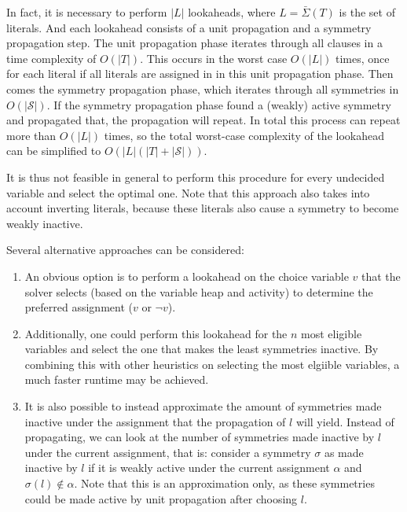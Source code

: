 In fact, it is necessary to perform $|L|$ lookaheads, where $L = \bar{\Sigma}(T)$ is the set of literals.
	And each lookahead consists of a unit propagation and a symmetry propagation step.
	The unit propagation phase iterates through all clauses in a time complexity of $O(|T|)$.
	This occurs in the worst case $O(|L|)$ times,
	once for each literal if all literals are assigned in in this unit propagation phase.
	Then comes the symmetry propagation phase, which iterates through all symmetries in $O(|\mathcal{S}|)$.
	If the symmetry propagation phase found a (weakly) active symmetry and propagated that,
	the propagation will repeat.
	In total this process can repeat more than $O(|L|)$ times,
	so the total worst-case complexity of the lookahead can be simplified to $O(|L|(|T| + |\mathcal{S}|))$.
	

	It is thus not feasible in general to perform this procedure for every undecided variable and
	select the optimal one.
	Note that this approach also takes into account inverting literals,
	because these literals also cause a symmetry to become weakly inactive.
	
	Several alternative approaches can be considered:

	\begin{enumerate}
		\item An obvious option is to perform a lookahead on the choice variable $v$ that the solver
			selects (based on the variable heap and activity) to determine the
			preferred assignment ($v$ or $\neg v$).

		\item Additionally, one could perform this lookahead for the $n$ most eligible variables
			and select the one that makes the least symmetries inactive.
			By combining this with other heuristics on selecting the most elgiible variables,
			a much faster runtime may be achieved.

		\item It is also possible to instead approximate the amount of symmetries made inactive under the
			assignment that the propagation of $l$ will yield.
			Instead of propagating, we can look at the number of symmetries made inactive by $l$
			under the current assignment, that is: consider a symmetry $\sigma$ as
			made inactive by $l$ if it is weakly active under the current assignment $\alpha$ and
			$\sigma(l) \notin \alpha$.
			Note that this is an approximation only, as these symmetries could be made active by
			unit propagation after choosing $l$.
	\end{enumerate}

